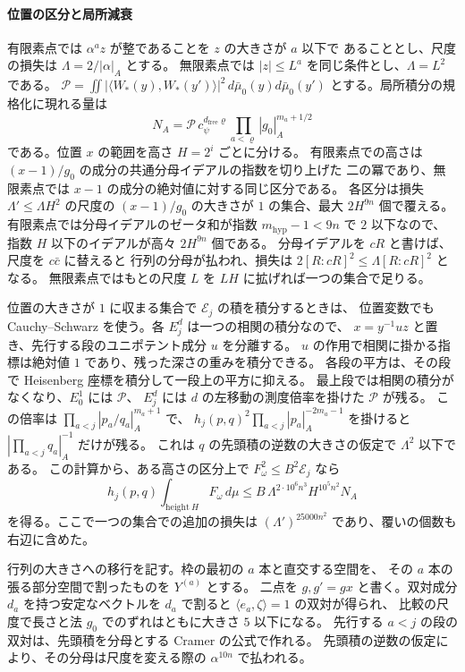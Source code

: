 \paragraph{位置の区分と局所減衰}\label{par:span-local-decay}
有限素点では \(\alpha^a z\) が整であることを \(z\) の大きさが \(a\) 以下で
あることとし、尺度の損失は \(\Lambda=2/|\alpha|_A\) とする。
無限素点では \(|z|\le L^a\) を同じ条件とし、\(\Lambda=L^2\) である。
\(\mathcal P=\iint|\langle W_\ast(y),W_\ast(y')\rangle|^2
\,d\bar\mu_0(y)d\bar\mu_0(y')\) とする。局所積分の規格化に現れる量は
\[
 N_A=\mathcal P\,c_\psi^{d_{\mathrm{free}}\varrho}
                    \prod_{a<\varrho}|g_0|_A^{m_a+1/2}
\]
である。位置 \(x\) の範囲を高さ \(H=2^i\) ごとに分ける。
有限素点での高さは \((x-1)/g_0\) の成分の共通分母イデアルの指数を切り上げた
二の冪であり、無限素点では \(x-1\) の成分の絶対値に対する同じ区分である。
各区分は損失 \(\Lambda'\le\Lambda H^2\) の尺度の
\((x-1)/g_0\) の大きさが \(1\) の集合、最大 \(2H^{9n}\) 個で覆える。
有限素点では分母イデアルのゼータ和が指数 \(m_\mathrm{hyp}-1<9n\) で
\(2\) 以下なので、指数 \(H\) 以下のイデアルが高々 \(2H^{9n}\) 個である。
分母イデアルを \(cR\) と書けば、尺度を \(c\bar c\) に替えると
行列の分母が払われ、損失は \(2[R:cR]^2\le\Lambda[R:cR]^2\) となる。
無限素点ではもとの尺度 \(L\) を \(LH\) に拡げれば一つの集合で足りる。

位置の大きさが \(1\) に収まる集合で \(\mathcal E_j\) の積を積分するときは、
位置変数でも Cauchy--Schwarz を使う。各 \(E_j^d\) は一つの相関の積分なので、
\(x=y^{-1}u z\) と置き、先行する段のユニポテント成分 \(u\) を分離する。
\(u\) の作用で相関に掛かる指標は絶対値 \(1\) であり、残った深さの重みを積分できる。
各段の平方は、その段で Heisenberg 座標を積分して一段上の平方に抑える。
最上段では相関の積分がなくなり、\(E_0^1\) には \(\mathcal P\)、
\(E_j^d\) には \(d\) の左移動の測度倍率を掛けた \(\mathcal P\) が残る。
この倍率は \(\prod_{a<j}|p_a/q_a|_A^{m_a+1}\) で、
\(h_j(p,q)^2\prod_{a<j}|p_a|_A^{-2m_a-1}\) を掛けると
\(|\prod_{a<j}q_a|_A^{-1}\) だけが残る。
これは \(q\) の先頭積の逆数の大きさの仮定で \(\Lambda^2\) 以下である。
この計算から、ある高さの区分上で
\(F_\omega^2\le B^2\mathcal E_j\) なら
\[
 h_j(p,q)\int_{\mathrm{height}\ H} F_\omega\,d\mu
 \le B\,\Lambda^{2\cdot10^6 n^3}H^{10^5n^2}N_A
\]
を得る。ここで一つの集合での追加の損失は
\((\Lambda')^{25000n^2}\) であり、覆いの個数も右辺に含めた。

行列の大きさへの移行を記す。枠の最初の \(a\) 本と直交する空間を、
その \(a\) 本の張る部分空間で割ったものを \(Y^{(a)}\) とする。
二点を \(g,g'=gx\) と書く。双対成分 \(d_a\) を持つ安定なベクトルを
\(d_a\) で割ると \(\langle e_a,\zeta\rangle=1\) の双対が得られ、
比較の尺度で長さと法 \(g_0\) でのずれはともに大きさ \(5\) 以下になる。
先行する \(a<j\) の段の双対は、先頭積を分母とする Cramer の公式で作れる。
先頭積の逆数の仮定により、その分母は尺度を変える際の
\(\alpha^{10n}\) で払われる。

